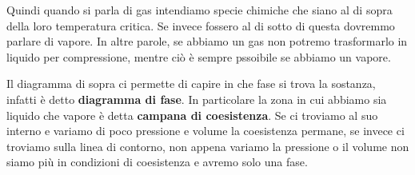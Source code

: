 \vspace{0.2cm}Quindi quando si parla di gas intendiamo specie chimiche che siano al di sopra della loro temperatura critica. Se invece fossero al di sotto di questa dovremmo parlare di vapore. In altre parole, se abbiamo un gas non potremo trasformarlo in liquido per compressione, mentre ciò è sempre pssoibile se abbiamo un vapore.

\vspace{0.2cm} Il diagramma di sopra ci permette di capire in che fase si trova la sostanza, infatti è detto \textbf{diagramma di fase}. In particolare la zona in cui abbiamo sia liquido che vapore è detta \textbf{campana di coesistenza}. Se ci troviamo al suo interno e variamo di poco pressione e volume la coesistenza permane, se invece ci troviamo sulla linea di contorno, non appena variamo la pressione o il volume non siamo più in condizioni di coesistenza e avremo solo una fase.